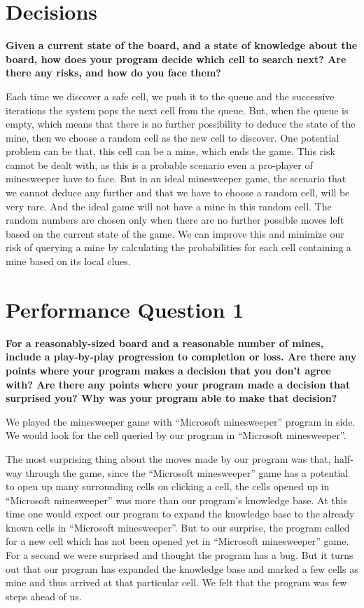 \documentclass[a4paper]{article}
\begin{document}
\section{Decisions}
\textbf{Given a current state of the board, and a state of knowledge about the board, how does your
program decide which cell to search next? Are there any risks, and how do you face them?}

Each time we discover a safe cell, we push it to the queue and the successive iterations the system pops the next cell from the queue. But, when the queue is empty, which means that there is no further possibility to deduce the state of the mine, then we choose a random cell as the new cell to discover. One potential problem can be that, this cell can be a mine, which ends the game. This risk cannot be dealt with, as this is a probable scenario even a pro-player of minesweeper have to face. But in an ideal minesweeper game, the scenario that we cannot deduce any further and that we have to choose a random cell, will  be very rare. And the ideal game will not have a mine in this random cell. The random numbers are chosen only when there are no further possible moves left based on the current state of the game. We can improve this and minimize our risk of querying a mine by calculating the probabilities for each cell containing a mine based on its local clues.

\section{Performance Question 1}
\textbf{For a reasonably-sized board and a reasonable number of mines, include a play-by-play progression
to completion or loss. Are there any points where your program makes a decision that you don't agree
with? Are there any points where your program made a decision that surprised you? Why was your program
able to make that decision?}

We played the minesweeper game with ``Microsoft minesweeper'' program in side. We would look for the cell queried by our program in  ``Microsoft minesweeper''. 

The most surprising thing about the moves made by our program was that, half-way through the game, since the ``Microsoft minesweeper'' game has a potential to open up many surrounding cells on clicking a cell, the cells opened up in  ``Microsoft minesweeper'' was more than our program's knowledge base. At this time one would expect our program to expand the knowledge base to the already known cells in  ``Microsoft minesweeper''. But to our surprise, the program called for a new cell which has not been opened yet in  ``Microsoft minesweeper'' game. For a second we were surprised and thought the program has a bug. But it turns out that our program has expanded the knowledge base and marked a few cells as mine and thus arrived at that particular cell. We felt that the program was few steps ahead of us.\\
\end{document}
